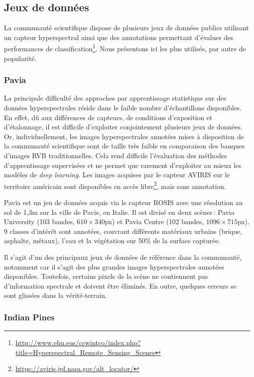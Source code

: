 \subsection{Jeux de données}

La communauté scientifique dispose de plusieurs jeux de données publics utilisant un capteur hyperspectral ainsi que des annotations permettant d'évaluer des performances de classification\footnote{\url{http://www.ehu.eus/ccwintco/index.php?title=Hyperspectral_Remote_Sensing_Scenes}}. Nous présentons ici les plus utilisés, par autre de popularité.

\subsubsection{Pavia}

La principale difficulté des approches par apprentissage statistique sur des données hyperspectrales réside dans le faible nombre d'échantillons disponibles. En effet, dû aux différences de capteurs, de conditions d'exposition et d'étalonnage, il est difficile d'exploiter conjointement plusieurs jeux de données. Or, individuellement, les images hyperspectrales annotées mises à disposition de la communauté scientifique sont de taille très faible en comparaison des banques d'images RVB traditionnelles. Cela rend difficile l'évaluation des méthodes d'apprentissage supervisées et ne permet que rarement d'exploiter au mieux les modèles de \textit{deep learning}. Les images acquises par le capteur AVIRIS sur le territoire américain sont disponibles en accès libre\footnote{\url{https://aviris.jpl.nasa.gov/alt_locator/}}, mais sans annotation.

Pavia est un jeu de données acquis via le capteur ROSIS avec une résolution au sol de 1,3m sur la ville de Pavie, en Italie. Il est divisé en deux scènes\,: Pavia University (103 bandes, $610\times340$px) et Pavia Centre (102 bandes, $1096\times715$px). 9 classes d'intérêt sont annotées, couvrant différents matériaux urbains (brique, asphalte, métaux), l'eau et la végétation sur 50\% de la surface capturée.

Il s'agit d'un des principaux jeux de données de référence dans la communauté, notamment car il s'agit des plus grandes images hyperspectrales annotées disponibles. Toutefois, certains pixels de la scène ne contiennent pas d'information spectrale et doivent être éliminés. En outre, quelques erreurs se sont glissées dans la vérité-terrain.

\subsubsection{Indian Pines}


